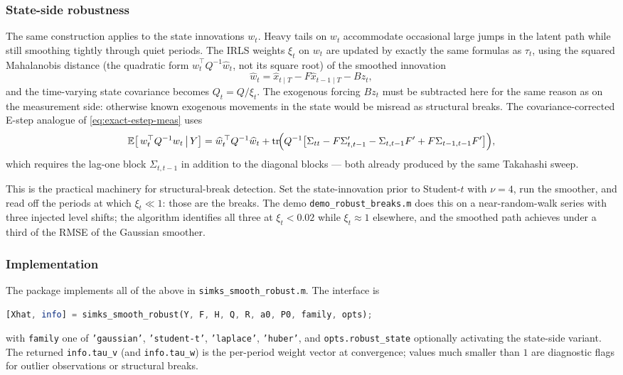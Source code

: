 \documentclass[11pt]{article}
\newcommand{\E}{\mathbb E}
\newcommand{\tr}{\operatorname{tr}}
\begin{document}
\subsubsection{State-side robustness}

The same construction applies to the state innovations $w_t$.  Heavy
tails on $w_t$ accommodate occasional large jumps in the latent path
while still smoothing tightly through quiet periods.  The IRLS weights
$\xi_t$ on $w_t$ are updated by exactly the same formulas as $\tau_t$,
using the squared Mahalanobis distance (the quadratic form
$\widehat w_t^\top Q^{-1}\widehat w_t$, not its square root) of the
smoothed innovation
\begin{equation}
\widehat w_t = \widehat x_{t\mid T} - F \widehat x_{t-1\mid T} - Bz_t,
\end{equation}
and the time-varying state covariance becomes $Q_t = Q/\xi_t$.  The
exogenous forcing $Bz_t$ must be subtracted here for the same reason
as on the measurement side: otherwise known exogenous movements in the
state would be misread as structural breaks.  The covariance-corrected
E-step analogue of \eqref{eq:exact-estep-meas} uses
\begin{equation}
\E\bigl[\,w_t^\top Q^{-1}w_t \,\big|\, Y\bigr]
= \widehat w_t^{\,\top} Q^{-1}\widehat w_t
 + \tr\!\Bigl(Q^{-1}\bigl[\Sigma_{tt}-F\Sigma_{t,t-1}'-\Sigma_{t,t-1}F'
 +F\Sigma_{t-1,t-1}F'\bigr]\Bigr),
\end{equation}
which requires the lag-one block $\Sigma_{t,t-1}$ in addition to the
diagonal blocks --- both already produced by the same Takahashi sweep.

This is the practical machinery for structural-break detection.  Set
the state-innovation prior to Student-$t$ with $\nu = 4$, run the
smoother, and read off the periods at which $\xi_t \ll 1$:  those are
the breaks.  The demo \texttt{demo\_robust\_breaks.m} does this on a
near-random-walk series with three injected level shifts; the
algorithm identifies all three at $\xi_t < 0.02$ while
$\xi_t \approx 1$ elsewhere, and the smoothed path achieves under a
third of the RMSE of the Gaussian smoother.

\subsubsection{Implementation}

The package implements all of the above in
\texttt{simks\_smooth\_robust.m}.  The interface is
\begin{lstlisting}[language=Octave]
[Xhat, info] = simks_smooth_robust(Y, F, H, Q, R, a0, P0, family, opts);
\end{lstlisting}
with \texttt{family} one of \texttt{'gaussian'}, \texttt{'student-t'},
\texttt{'laplace'}, \texttt{'huber'}, and \texttt{opts.robust\_state}
optionally activating the state-side variant.  The returned
\texttt{info.tau\_v} (and \texttt{info.tau\_w}) is the per-period
weight vector at convergence; values much smaller than $1$ are
diagnostic flags for outlier observations or structural breaks.
\end{document}
